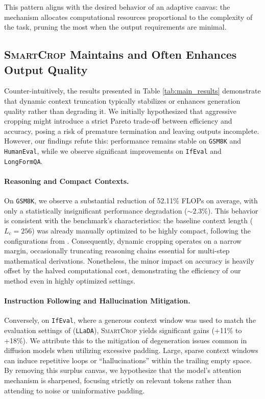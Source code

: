 \documentclass{article}
\theoremstyle{plain}
\theoremstyle{definition}
\theoremstyle{remark}
\begin{document}
This pattern aligns with the desired behavior of an adaptive canvas: the mechanism allocates computational resources proportional to the complexity of the task, pruning the most when the output requirements are minimal.

\subsection{\textsc{SmartCrop} Maintains and Often Enhances Output Quality}

Counter-intuitively, the results presented in Table \ref{tab:main_results} demonstrate that dynamic context truncation typically stabilizes or enhances generation quality rather than degrading it. We initially hypothesized that aggressive cropping might introduce a strict Pareto trade-off between efficiency and accuracy, posing a risk of premature termination and leaving outputs incomplete. However, our findings refute this: performance remains stable on \texttt{GSM8K} and \texttt{HumanEval}, while we observe significant improvements on \texttt{IfEval} and \texttt{LongFormQA}.

\paragraph{Reasoning and Compact Contexts.} On \texttt{GSM8K}, we observe a substantial reduction of 52.11\% FLOPs on average, with only a statistically insignificant performance degradation ($\sim 2.3\%$). This behavior is consistent with the benchmark's characteristics: the baseline context length ($L_c=256$) was already manually optimized to be highly compact, following the configurations from \citet{nie2025large}. Consequently, dynamic cropping operates on a narrow margin, occasionally truncating reasoning chains essential for multi-step mathematical derivations. Nonetheless, the minor impact on accuracy is heavily offset by the halved computational cost, demonstrating the efficiency of our method even in highly optimized settings.

\paragraph{Instruction Following and Hallucination Mitigation.} Conversely, on \texttt{IfEval}, where a generous context window was used to match the evaluation settings of \citet{nie2025large} (\texttt{LLaDA}), \textsc{SmartCrop} yields significant gains (+11\% to +18\%). We attribute this to the mitigation of degeneration issues common in diffusion models when utilizing excessive padding. Large, sparse context windows can induce repetitive loops or ``hallucinations'' within the trailing empty space. By removing this surplus canvas, we hypothesize that the model's attention mechanism is sharpened, focusing strictly on relevant tokens rather than attending to noise or uninformative padding.
\end{document}
